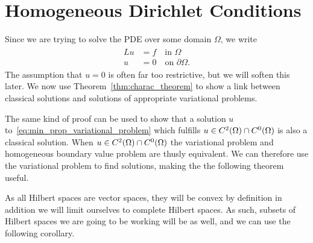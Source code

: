 \section{Homogeneous Dirichlet Conditions}
Since we are trying to solve the PDE over some domain $\Omega$, we write
\begin{align}
\begin{split}
    Lu &= f \quad \text{in } \Omega \label{eq:b_v_problem_homogeneous} \\
    u &= 0 \quad \text{on } \partial \Omega. 
\end{split}
\end{align}
The assumption that $u=0$ is often far too restrictive, but we will soften this later.
We now use Theorem~\ref{thm:charac_theorem} to show a link between classical 
solutions and solutions of appropriate variational problems.

The same kind of proof can be used to show that a solution $u$ to~\eqref{eq:min_prop_variational_problem} which fulfills 
$u\in C^2(\Omega) \cap C^0(\Omega)$ is also a classical solution. 
When $u\in C^2(\Omega) \cap C^0(\Omega)$ the variational problem and 
homogeneous boundary value problem are thusly equivalent.
We can therefore use the variational problem to find solutions, making the
 the following theorem useful.

As all Hilbert spaces are vector spaces, they will be convex by definition in addition we will limit ourselves to complete Hilbert spaces.
As such, subsets of Hilbert spaces we are going to be working will be as well,
and we can use the following corollary.


